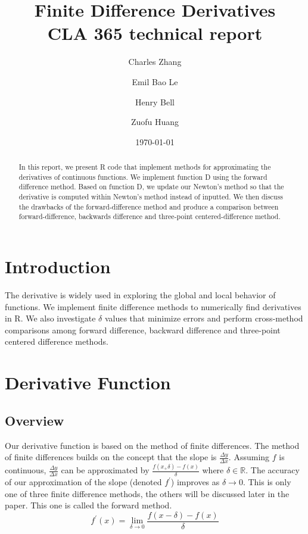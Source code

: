 \documentclass{article}
\title{{\sffamily Finite Difference Derivatives} \\ 
{\sc CLA 365 technical report }}
\author{Charles Zhang \and Emil Bao Le \and Henry Bell \and Zuofu Huang}
\date{\today}
\begin{document}
\maketitle

\begin{abstract} 

\noindent In this report, we present R code that implement methods for approximating the derivatives of continuous functions. We implement function D using the forward difference method. Based on function D, we update our Newton's method so that the derivative is computed within Newton's method instead of inputted. We then discuss the drawbacks of the forward-difference method and produce a comparison between forward-difference, backwards difference and three-point centered-difference method.

\end{abstract}
\section*{Introduction}

The derivative is widely used in exploring the global and local behavior of functions. We implement finite difference methods to numerically find derivatives in R. We also investigate $\delta$ values that minimize errors and perform cross-method comparisons among forward difference, backward difference and three-point centered difference methods.

\section{Derivative Function}
\subsection{Overview}

Our derivative function is based on the method of finite differences.
The method of finite differences builds on the concept that the slope is $\frac{\Delta y}{\Delta x}$. Assuming $f$ is continuous, $\frac{\Delta y}{\Delta x}$ can be approximated by $\frac{f(x_ + \delta) - f(x)}{\delta}$ where $\delta \in \mathbb{R}$. The accuracy of our approximation of the slope (denoted $f^{\prime}$) improves as $\delta \rightarrow 0$. This is only one of three finite difference methods, the others will be discussed later in the paper. This one is called the forward method. \\

\begin{equation}
f^{\prime}(x)=\lim \limits_{\delta\rightarrow0}\frac{f(x-\delta)-f(x)}{\delta}
\end{equation}
\end{document}
